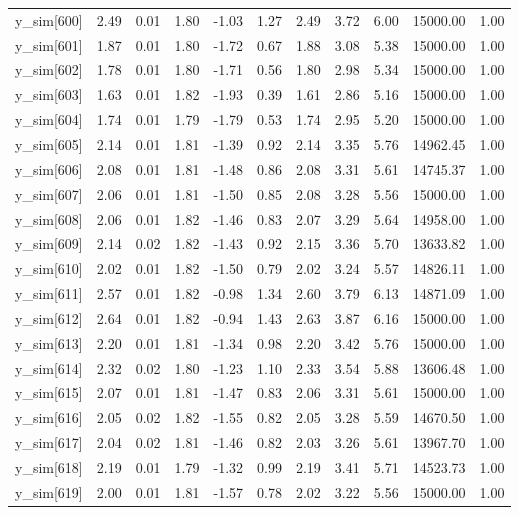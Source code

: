 \begin{table}[ht]
\begin{tabular}{rrrrrrrrrrr}
  y\_sim[600] & 2.49 & 0.01 & 1.80 & -1.03 & 1.27 & 2.49 & 3.72 & 6.00 & 15000.00 & 1.00 \\ 
  y\_sim[601] & 1.87 & 0.01 & 1.80 & -1.72 & 0.67 & 1.88 & 3.08 & 5.38 & 15000.00 & 1.00 \\ 
  y\_sim[602] & 1.78 & 0.01 & 1.80 & -1.71 & 0.56 & 1.80 & 2.98 & 5.34 & 15000.00 & 1.00 \\ 
  y\_sim[603] & 1.63 & 0.01 & 1.82 & -1.93 & 0.39 & 1.61 & 2.86 & 5.16 & 15000.00 & 1.00 \\ 
  y\_sim[604] & 1.74 & 0.01 & 1.79 & -1.79 & 0.53 & 1.74 & 2.95 & 5.20 & 15000.00 & 1.00 \\ 
  y\_sim[605] & 2.14 & 0.01 & 1.81 & -1.39 & 0.92 & 2.14 & 3.35 & 5.76 & 14962.45 & 1.00 \\ 
  y\_sim[606] & 2.08 & 0.01 & 1.81 & -1.48 & 0.86 & 2.08 & 3.31 & 5.61 & 14745.37 & 1.00 \\ 
  y\_sim[607] & 2.06 & 0.01 & 1.81 & -1.50 & 0.85 & 2.08 & 3.28 & 5.56 & 15000.00 & 1.00 \\ 
  y\_sim[608] & 2.06 & 0.01 & 1.82 & -1.46 & 0.83 & 2.07 & 3.29 & 5.64 & 14958.00 & 1.00 \\ 
  y\_sim[609] & 2.14 & 0.02 & 1.82 & -1.43 & 0.92 & 2.15 & 3.36 & 5.70 & 13633.82 & 1.00 \\ 
  y\_sim[610] & 2.02 & 0.01 & 1.82 & -1.50 & 0.79 & 2.02 & 3.24 & 5.57 & 14826.11 & 1.00 \\ 
  y\_sim[611] & 2.57 & 0.01 & 1.82 & -0.98 & 1.34 & 2.60 & 3.79 & 6.13 & 14871.09 & 1.00 \\ 
  y\_sim[612] & 2.64 & 0.01 & 1.82 & -0.94 & 1.43 & 2.63 & 3.87 & 6.16 & 15000.00 & 1.00 \\ 
  y\_sim[613] & 2.20 & 0.01 & 1.81 & -1.34 & 0.98 & 2.20 & 3.42 & 5.76 & 15000.00 & 1.00 \\ 
  y\_sim[614] & 2.32 & 0.02 & 1.80 & -1.23 & 1.10 & 2.33 & 3.54 & 5.88 & 13606.48 & 1.00 \\ 
  y\_sim[615] & 2.07 & 0.01 & 1.81 & -1.47 & 0.83 & 2.06 & 3.31 & 5.61 & 15000.00 & 1.00 \\ 
  y\_sim[616] & 2.05 & 0.02 & 1.82 & -1.55 & 0.82 & 2.05 & 3.28 & 5.59 & 14670.50 & 1.00 \\ 
  y\_sim[617] & 2.04 & 0.02 & 1.81 & -1.46 & 0.82 & 2.03 & 3.26 & 5.61 & 13967.70 & 1.00 \\ 
  y\_sim[618] & 2.19 & 0.01 & 1.79 & -1.32 & 0.99 & 2.19 & 3.41 & 5.71 & 14523.73 & 1.00 \\ 
  y\_sim[619] & 2.00 & 0.01 & 1.81 & -1.57 & 0.78 & 2.02 & 3.22 & 5.56 & 15000.00 & 1.00 \\ 

\end{tabular}
\end{table}
